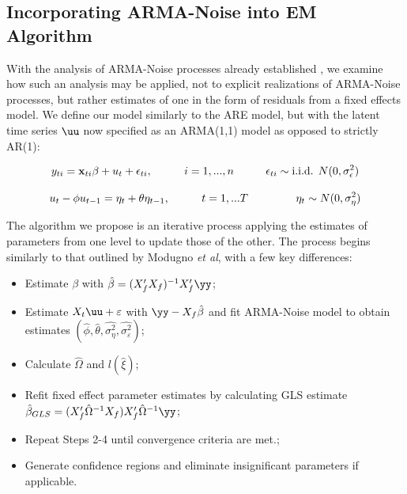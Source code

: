 \subsection{Incorporating ARMA-Noise into EM Algorithm}

With the analysis of ARMA-Noise processes already established \citep{WongMiller1990}, we examine how such an analysis may be applied, not to explicit realizations of ARMA-Noise processes, but rather estimates of one in the form of residuals from a fixed effects model. We define our model similarly to the ARE model, but with the latent time series $\uu$ now specified as an ARMA(1,1) model as opposed to strictly AR(1):

\begin{equation}
    \label{eq:fullmodel1}
    y_{ti} = \mathbf{x}_{ti}\beta + u_t + \epsilon_{ti}, \hspace{.4in} i = 1,...,n \hspace{.4 in} \epsilon_{ti} \sim \text{i.i.d. } N(0,\sigma_\epsilon^2) 
\end{equation}

\begin{equation}
    \label{eq:fullmodel2}
    u_t - \phi u_{t-1} = \eta_t + \theta \eta_{t-1} , \hspace{.4in} t=1,...T \hspace{.4in}  \hspace{.2in} \eta_t \sim N(0,\sigma_\eta^2) 
\end{equation}

The algorithm we propose is an iterative process applying the estimates of parameters from one level to update those of the other. The process begins similarly to that outlined by Modugno \textit{et al}, with a few key differences:

\begin{itemize}
    \item[1)] Estimate ${\beta}$ with $\hat{\beta} = (X_f'X_f)^{-1}X_f'\yy$;
    \item[2)] Estimate $X_t\uu + \varepsilon$ with $\yy - X_f\hat{\beta}$ and fit ARMA-Noise model to obtain estimates $(\hat{\phi}, \hat{\theta}, \hat{\sigma_\eta^2}, \hat{\sigma_\varepsilon^2})$;
    \item[3)] Calculate $\hat{\Omega}$ and $l(\hat{\xi})$;
    \item[4)] Refit fixed effect parameter estimates by calculating GLS estimate $\hat{\beta}_{GLS} = (X_f'\hat{\Omega}^{-1}X_f)X_f'\hat{\Omega}^{-1}\yy$;
    \item[5)] Repeat Steps 2-4 until convergence criteria are met.;
    \item[6)] Generate confidence regions and eliminate insignificant parameters if applicable.
\end{itemize}

